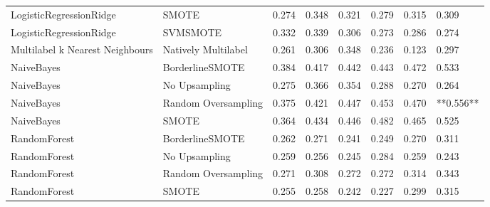\begin{tabular}{llllllll}
        LogisticRegressionRidge &                         SMOTE & 0.274 &                     0.348 &                 0.321 &                  0.279 &                                   0.315 &     0.309 \\
        LogisticRegressionRidge &                      SVMSMOTE & 0.332 &                     0.339 &                 0.306 &                  0.273 &                                   0.286 &     0.274 \\
Multilabel k Nearest Neighbours &           Natively Multilabel & 0.261 &                     0.306 &                 0.348 &                  0.236 &                                   0.123 &     0.297 \\
                     NaiveBayes &               BorderlineSMOTE & 0.384 &                     0.417 &                 0.442 &                  0.443 &                                   0.472 &     0.533 \\
                     NaiveBayes &                 No Upsampling & 0.275 &                     0.366 &                 0.354 &                  0.288 &                                   0.270 &     0.264 \\
                     NaiveBayes &           Random Oversampling & 0.375 &                     0.421 &                 0.447 &                  0.453 &                                   0.470 & **0.556** \\
                     NaiveBayes &                         SMOTE & 0.364 &                     0.434 &                 0.446 &                  0.482 &                                   0.465 &     0.525 \\
                   RandomForest &               BorderlineSMOTE & 0.262 &                     0.271 &                 0.241 &                  0.249 &                                   0.270 &     0.311 \\
                   RandomForest &                 No Upsampling & 0.259 &                     0.256 &                 0.245 &                  0.284 &                                   0.259 &     0.243 \\
                   RandomForest &           Random Oversampling & 0.271 &                     0.308 &                 0.272 &                  0.272 &                                   0.314 &     0.343 \\
                   RandomForest &                         SMOTE & 0.255 &                     0.258 &                 0.242 &                  0.227 &                                   0.299 &     0.315 \\

\end{tabular}
